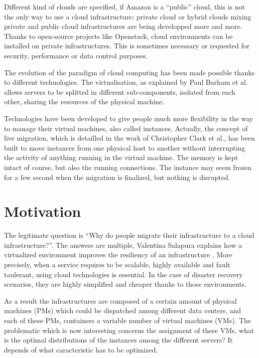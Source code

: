 \documentclass[a4paper,11pt]{article}
\begin{document}
Different kind of clouds are specified, if Amazon is a “public” cloud, this is
not the only way to use a cloud infrastructure: private cloud or hybrid clouds
mixing private and public cloud infrastructures are being developped more and
more. Thanks to open-source projects like Openstack\cite{website:openstack},
cloud environments can be installed on private infrastructures. This is
sometimes necessary or requested for security, performance or data control
purposes.

The evolution of the paradigm of cloud computing has been made possible thanks
to different technologies. The virtualisation, as explained by Paul Barham et
al.\cite{virtualisation} allows servers to be splitted in different
sub-components, isolated from each other, sharing the resources of the physical
machine. 

Technologies have been developed to give people much more flexibility
in the way to manage their virtual machines, also called instances. Actually,
the concept of live migration, which is detailled in the work of Christopher
Clark et al.\cite{livemigration}, has been built to move instances from one
physical host to another without interrupting the activity of anything running
in the virtual machine. The memory is kept intact of course, but also the
running connections.  The instance may seem frozen for a few second when the
migration is finalized, but nothing is disrupted.

\section{Motivation}

The legitimate question is “Why do people migrate their infrastructure to a
cloud infrastructure?”. The answers are multiple, Valentina Salapura explains
how a virtualized environment improves the resiliency of an
infrastructure \cite{virtresiliency}. More precisely, when a service requires
to be scalable, highly available and fault taulerant, using cloud technologies
is essential. In the case of disaster recovery scenarios, they are highly
simplified and cheaper thanks to those environments.

As a result the infrastructures are composed of a certain amount of physical
machines (PMs) which could be dispatched among different data centers, and each
of these PMs, containers a variable number of virtual machines (VMs). The
problematic which is now interesting concerns the assignment of these VMs, what
is the optimal distributions of the instances among the different servers? It
depends of what caracteristic has to be optimized.
\end{document}
